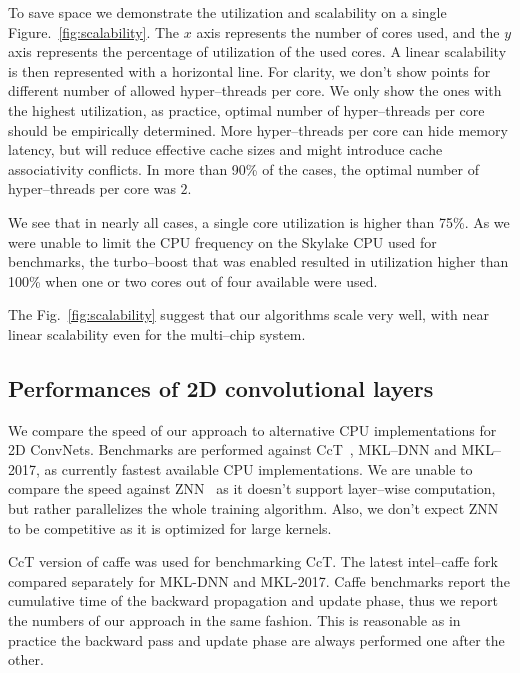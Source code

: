   To save space we demonstrate the utilization and scalability on a
  single Figure.~\ref{fig:scalability}.  The $x$ axis represents the
  number of cores used, and the $y$ axis represents the percentage of
  utilization of the used cores.  A linear scalability is then
  represented with a horizontal line.  For clarity, we don't show
  points for different number of allowed hyper--threads per core.  We
  only show the ones with the highest utilization, as practice,
  optimal number of hyper--threads per core should be empirically
  determined.  More hyper--threads per core can hide memory latency,
  but will reduce effective cache sizes and might introduce cache
  associativity conflicts.  In more than 90\% of the cases, the
  optimal number of hyper--threads per core was $2$.

  We see that in nearly all cases, a single core utilization is higher
  than 75\%.  As we were unable to limit the CPU frequency on the
  Skylake CPU used for benchmarks, the turbo--boost that was enabled
  resulted in utilization higher than 100\% when one or two cores out
  of four available were used.

  The Fig.~\ref{fig:scalability} suggest that our algorithms scale
  very well, with near linear scalability even for the multi--chip
  system.

  \subsection{Performances of 2D convolutional layers}

  We compare the speed of our approach to alternative CPU
  implementations for 2D ConvNets.  Benchmarks are performed against
  CcT~\cite{hadjis2015shallow}, MKL--DNN and MKL--2017, as currently
  fastest available CPU implementations.  We are unable to compare the
  speed against ZNN~\cite{zlateski2016znn} as it doesn't support
  layer--wise computation, but rather parallelizes the whole training
  algorithm.  Also, we don't expect ZNN to be competitive as it is
  optimized for large kernels.

  CcT version of caffe was used for benchmarking CcT.  The latest
  intel--caffe fork compared separately for MKL-DNN and MKL-2017.
  Caffe benchmarks report the cumulative time of the backward
  propagation and update phase, thus we report the numbers of our
  approach in the same fashion.  This is reasonable as in practice the
  backward pass and update phase are always performed one after the
  other.

